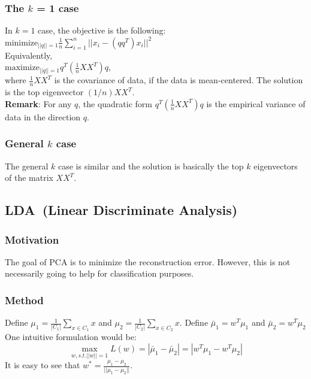 \subsubsection{The $k$ = 1 case}
In $k=1$ case, the objective is the following:\\

$\textrm{minimize}_{||q||=1} \frac{1}{n} \sum_{i=1}^n
||x_i - (qq^T)x_i||^2$\\

\noindent Equivalently,\\

$\textrm{maximize}_{||q||=1}q^T(\frac{1}{n} XX^T)q$, \\

\noindent where $\frac{1}{n}XX^T$ is the covariance of data, if the
data is mean-centered. The solution is the top eigenvector
$(1/n)XX^T$.\\ 

\noindent \textbf{Remark}: For any $q$, the quadratic form
$q^T(\frac{1}{n}XX^T)q$ is the empirical variance of data in the
direction $q$. 
\subsubsection{General $k$ case}
The general $k$ case is similar and the solution is basically the top
$k$ eigenvectors of the matrix $XX^T$.\\ 

\subsection{LDA~(Linear Discriminate Analysis)}
\subsubsection{Motivation}
The goal of PCA is to minimize the reconstruction error. However, this
is not necessarily going to help for classification purposes. 
\subsubsection{Method}
Define $\mu_1=\frac{1}{|C_1|} \sum_{x\in C_1} x$ and
$\mu_2=\frac{1}{|C_2|} \sum_{x\in C_2} x$. Define $\bar{\mu}_1=w^T
\mu_1$ and $\bar{\mu}_2=w^T \mu_2$\\ 
One intuitive formulation would be:
\[
\max_{w,s.t.||w||=1} L(w) = |\bar{\mu}_1 - \bar{\mu}_2| = |w^T\mu_1 - w^T\mu_2|
\]
It is easy to see that $w^*=\frac{\mu_1 - \mu_2}{||\mu_1-\mu_2||}$.\\

